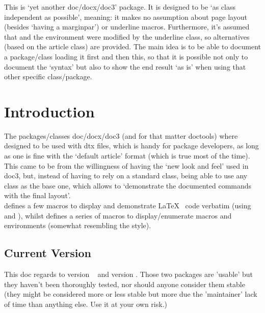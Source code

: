 \documentclass[dctools,english]{ufrgscca}
\begin{document}
\dcMakeTitle

\begin{dcAbstract}
This is `yet another doc/docx/doc3' package. It is designed to be `as class independent as possible', meaning: it makes no assumption about page layout (besides `having a marginpar') or underline macros. Furthermore, it's assumed that \Macro{\maketitle}{} and the  environment were modified by the underline class, so alternatives (based on the article class) are provided. The main idea is to be able to document  a package/class loading it first and then this, so that it is possible not only to document the `syntax' but also to show the end result `as is' when using that other specific class/package.

\end{dcAbstract}

\tableofcontents

\section{Introduction}
The packages/classes doc/docx/doc3 (and for that matter doctools) where designed to be used with dtx files, which is handy for package developers, as long as one is fine with the `default article' format (which is true most of the time). This came to be from the willingness of having the `new look and feel' used in doc3, but, instead of having to rely on a standard class, being able to use any class as the base one, which allows to `demonstrate the documented commands with the final layout'.\\

 defines a few macros to display and demonstrate \LaTeX~ code verbatim (using  and ), whilst  defines a series of macros to display/enumerate macros and environments (somewhat resembling the  style).\\
\subsection{Current Version}
This doc regards to  version \democodelistingversion~ and  version \democodetoolsversion. Those two packages are 'usable' but they haven't been thoroughly tested, nor should  anyone consider them stable (they might be considered more or less stable but more due the 'maintainer'  lack of time than anything else. Use it at your own risk.)
\end{document}
